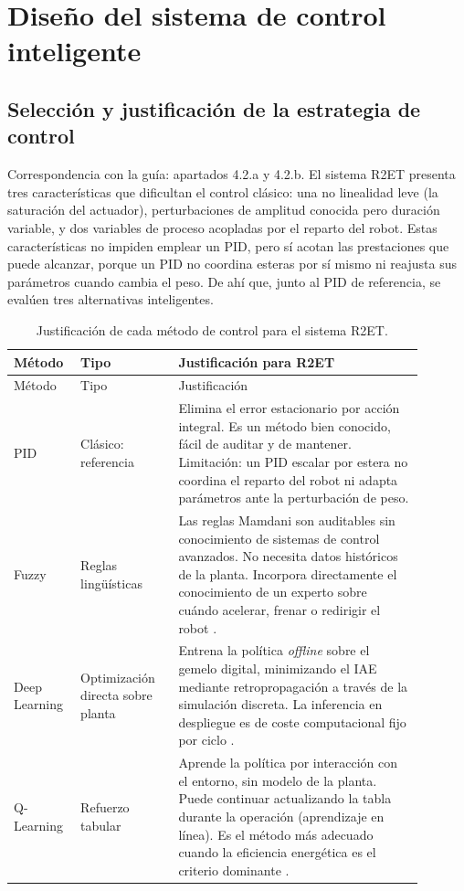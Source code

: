 \chapter[Diseño del control inteligente]{Diseño del sistema de control inteligente}
\label{ch:diseno}

\section{Selección y justificación de la estrategia de control}

Correspondencia con la guía: apartados 4.2.a y 4.2.b. El sistema R2ET presenta tres características que dificultan el control clásico: una no linealidad leve (la saturación del actuador), perturbaciones de amplitud conocida pero duración variable, y dos variables de proceso acopladas por el reparto del robot. Estas características no impiden emplear un PID, pero sí acotan las prestaciones que puede alcanzar, porque un PID no coordina esteras por sí mismo ni reajusta sus parámetros cuando cambia el peso. De ahí que, junto al PID de referencia, se evalúen tres alternativas inteligentes.

\begin{longtable}{@{}P{0.12\linewidth}P{0.22\linewidth}P{0.55\linewidth}@{}}
\caption{Justificación de cada método de control para el sistema R2ET.}
\label{tab:justificacion}\\
\toprule
Método & Tipo & Justificación para R2ET \\ \midrule \endfirsthead
\toprule Método & Tipo & Justificación \\ \midrule \endhead
PID & Clásico: referencia & Elimina el error estacionario por acción integral. Es un método bien conocido, fácil de auditar y de mantener. Limitación: un PID escalar por estera no coordina el reparto del robot ni adapta parámetros ante la perturbación de peso.\\[4pt]
Fuzzy & Reglas lingüísticas & Las reglas Mamdani son auditables sin conocimiento de sistemas de control avanzados. No necesita datos históricos de la planta. Incorpora directamente el conocimiento de un experto sobre cuándo acelerar, frenar o redirigir el robot \cite{ross2010fuzzy,kasabov1996foundations}.\\[4pt]
Deep Learning & Optimización directa sobre planta & Entrena la política \emph{offline} sobre el gemelo digital, minimizando el IAE mediante retropropagación a través de la simulación discreta. La inferencia en despliegue es de coste computacional fijo por ciclo \cite{reinoso2022redes}.\\[4pt]
Q-Learning & Refuerzo tabular & Aprende la política por interacción con el entorno, sin modelo de la planta. Puede continuar actualizando la tabla durante la operación (aprendizaje en línea). Es el método más adecuado cuando la eficiencia energética es el criterio dominante \cite{sutton2018reinforcement}.\\
\bottomrule
\end{longtable}

